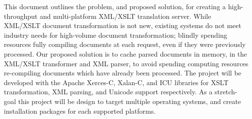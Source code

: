 %
% 
This document outlines the problem, and proposed solution, for creating a high-throughput and multi-platform XML/XSLT translation server. 
While XML/XSLT document transformation is not new, existing systems do not meet industry needs for high-volume document transformation; blindly spending resources fully compiling documents at each request, even if they were previously processed.
Our proposed solution is to cache parsed documents in memory, in the XML/XSLT transformer and XML parser, to avoid spending computing resources re-compiling documents which have already been processed.
The project will be developed with the Apache Xerces-C, Xalan-C, and ICU libraries for XSLT transformation, XML parsing, and Unicode support respectively.
As a stretch-goal this project will be design to target multiple operating systems, and create installation packages for each supported platforms.
